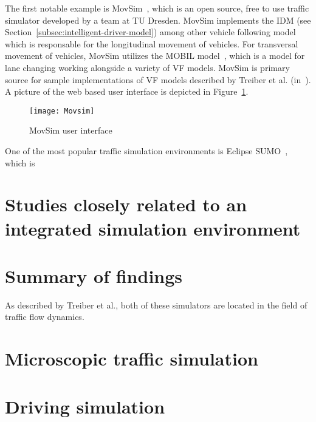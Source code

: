             The first notable example is MovSim~\cite{Treiber2010}, which is an open source, free to use traffic simulator developed by a team at TU Dresden.
            MovSim implements the IDM (see Section~\ref{subsec:intelligent-driver-model}) among other vehicle following model which is responsable for the longitudinal movement of vehicles.
            For transversal movement of vehicles, MovSim utilizes the MOBIL model~\cite{kesting2007general}, which is a model for lane changing working alongside a variety of VF models.
            MovSim is primary source for sample implementations of VF models described by Treiber et al. (in~\cite{treiber2013traffic}).
            A picture of the web based user interface is depicted in Figure~\ref{fig:mov-sim-ui}.

            \begin{figure}
                \centering
                \texttt{[image: Movsim]}
                \caption{MovSim user interface~\cite{MovSimUI}}
                \label{fig:mov-sim-ui}
            \end{figure}

            One of the most popular traffic simulation environments is Eclipse SUMO~\cite{Behrisch2011SUMOS}, which is


    \section{Studies closely related to an integrated simulation environment}\label{sec:studies-closely-related-to-an-integrated-simulation-environment}

    \section{Summary of findings}\label{sec:summary-of-findings}

    As described by Treiber et al., both of these simulators are located in the field of traffic flow dynamics.



    \section{Microscopic traffic simulation}\label{sec:microscopic-traffic-simulation}


    \section{Driving simulation}\label{sec:driving-simulation}


